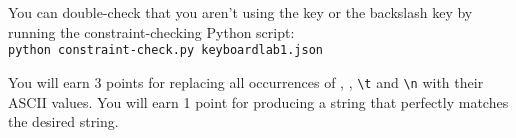You can double-check that you aren't using the \missingKey key or the backslash key by running the constraint-checking Python script: \\
\texttt{python constraint-check.py keyboardlab1.json}

You will earn 3 points for replacing all occurrences of \texttt{\missingKey}, \texttt{\lowercaseKey}, \texttt{\textbackslash t} and \texttt{\textbackslash n} with their ASCII values.
You will earn 1 point for producing a string that perfectly matches the desired string.
